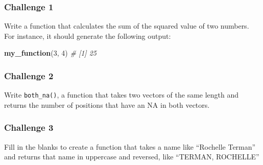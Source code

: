 \documentclass[]{book}
\newenvironment{Shaded}{\begin{snugshade}}{\end{snugshade}}
\newcommand{\KeywordTok}[1]{\textcolor[rgb]{0.13,0.29,0.53}{\textbf{#1}}}
\newcommand{\DecValTok}[1]{\textcolor[rgb]{0.00,0.00,0.81}{#1}}
\newcommand{\CommentTok}[1]{\textcolor[rgb]{0.56,0.35,0.01}{\textit{#1}}}
\newcommand{\NormalTok}[1]{#1}
\begin{document}
\subsubsection*{Challenge 1}\label{challenge-1-2}

Write a function that calculates the sum of the squared value of two
numbers. For instance, it should generate the following output:

\begin{Shaded}
\begin{Highlighting}[]
\KeywordTok{my_function}\NormalTok{(}\DecValTok{3}\NormalTok{, }\DecValTok{4}\NormalTok{)}
\CommentTok{# [1] 25}
\end{Highlighting}
\end{Shaded}

\subsubsection*{Challenge 2}\label{challenge-2-2}

Write \texttt{both\_na()}, a function that takes two vectors of the same
length and returns the number of positions that have an NA in both
vectors.

\subsubsection*{Challenge 3}\label{challenge-3-1}

Fill in the blanks to create a function that takes a name like
``Rochelle Terman'' and returns that name in uppercase and reversed,
like ``TERMAN, ROCHELLE''
\end{document}
